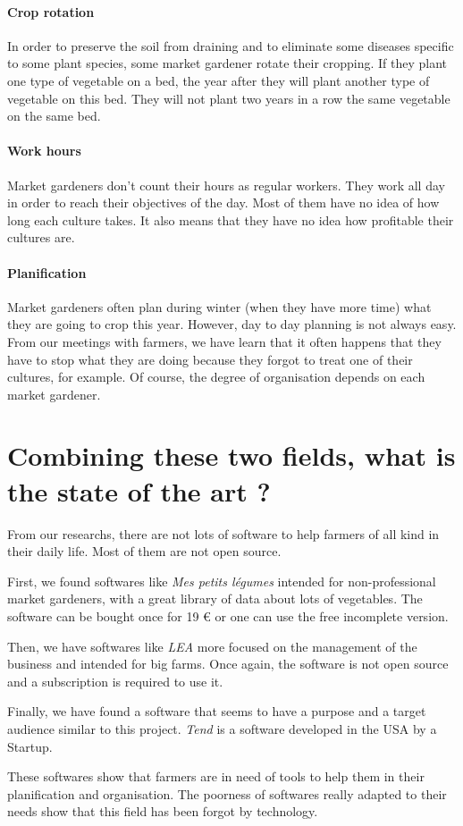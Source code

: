 \paragraph{Crop rotation} In order to preserve the soil from draining and to eliminate some diseases specific to some plant species, some market gardener rotate their cropping. If they plant one type of vegetable on a bed, the year after they will plant another type of vegetable on this bed. They will not plant two years in a row the same vegetable on the same bed.

\paragraph{Work hours} Market gardeners don't count their hours as regular workers. They work all day in order to reach their objectives of the day. Most of them have no idea of how long each culture takes. It also means that they have no idea how profitable their cultures are. 

\paragraph{Planification} Market gardeners often plan during winter (when they have more time) what they are going to crop this year. However, day to day planning is not always easy. From our meetings with farmers, we have learn that it often happens that they have to stop what they are doing because they forgot to treat one of their cultures, for example. Of course, the degree of organisation depends on each market gardener.

\section{Combining these two fields, what is the state of the art ? }

From our researchs, there are not lots of software to help farmers of all kind in their daily life. Most of them are not open source.

First, we found softwares like \emph{Mes petits légumes}\cite{mespetitslegumes} intended for non-professional market gardeners, with a great library of data about lots of vegetables. The software can be bought once for 19 \euro{} or one can use the free incomplete version.

Then, we have softwares like \emph{LEA}\cite{lea-agri} more focused on the management of the business and intended for big farms. Once again, the software is not open source and a subscription is required to use it.

Finally, we have found a software that seems to have a purpose and a target audience similar to this project. \emph{Tend}\cite{tend} is a software developed in the USA by a Startup.

These softwares show that farmers are in need of tools to help them in their planification and organisation. The poorness of softwares really adapted to their needs show that this field has been forgot by technology.

